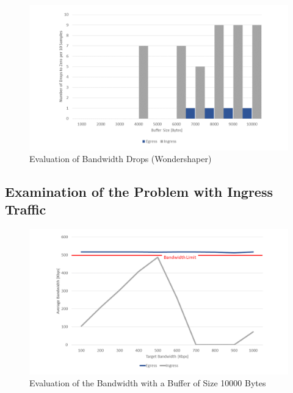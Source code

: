 \begin{figure}[h]
	\centering
	\includegraphics[width=\textwidth]{img/Evaluation-Zeros-Wondershaper.png}
	\caption{Evaluation of Bandwidth Drops (Wondershaper)}
	\label{Evaluation of the Bandwidth Drops (Wondershaper)}
\end{figure}

\newpage
\subsection{Examination of the Problem with Ingress Traffic}
\begin{figure}[h]
	\centering
	\includegraphics[width=\textwidth]{img/Evaluation-Bandwidth-Big-Buffer.png}
	\caption{Evaluation of the Bandwidth with a Buffer of Size 10000 Bytes}
	\label{Evaluation of the Bandwidth with a Buffer of Size 10000 Bytes}
\end{figure}

